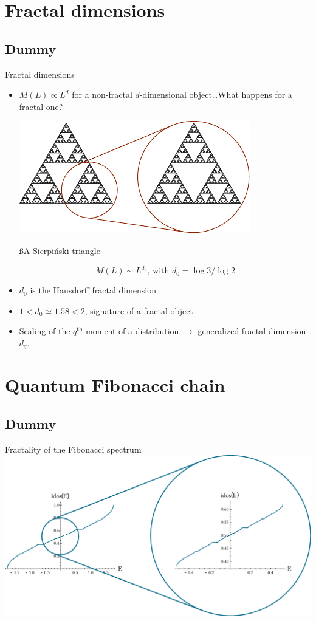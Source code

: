 \section{Fractal dimensions}
\subsection{Dummy}
\begin{frame}{Fractal dimensions}
\begin{itemize}
	\item $M(L) \propto L^d$ for a non-fractal $d$-dimensional object\dots What happens for a fractal one?
	
	{\centering
	\includegraphics[width=.4\textwidth]{img/sierpinski}
	
	{\ss A Sierpiński triangle}
	
	}
	
	\[
		M(L) \sim L^{d_0} \text{, with } d_0 = \log 3/\log 2
	\]
	
	\item $d_0$ is the Hausdorff fractal dimension
	\item $1 < d_0 \simeq 1.58 < 2$, signature of a fractal object
	\item Scaling of the $q^\text{th}$ moment of a distribution $\to$ generalized fractal dimension $d_q$.
\end{itemize}
\end{frame}

\section{Quantum Fibonacci chain}
\subsection{Dummy}
\begin{frame}{Fractality of the Fibonacci spectrum}
\centering
\includegraphics[width=1.\textwidth]{img/idos}	

\end{frame}

